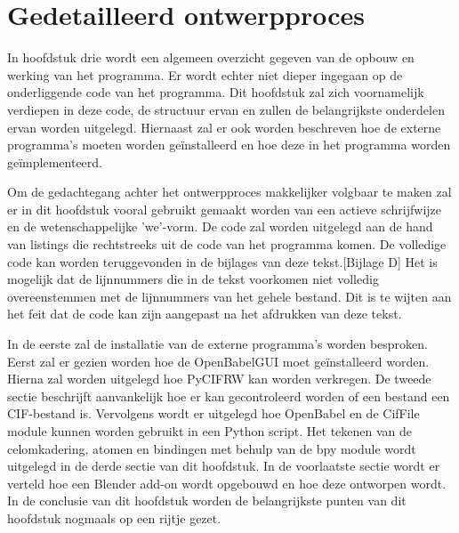 

\chapter{Gedetailleerd ontwerpproces}

In hoofdstuk drie wordt een algemeen overzicht gegeven van de opbouw en werking van het programma. Er wordt echter niet dieper ingegaan op de onderliggende code van het programma. Dit hoofdstuk zal zich voornamelijk verdiepen in deze code, de structuur ervan en zullen de belangrijkste onderdelen ervan worden uitgelegd. Hiernaast zal er ook worden beschreven hoe de externe programma's moeten worden geïnstalleerd en hoe deze in het programma worden geïmplementeerd. 
\par
Om de gedachtegang achter het ontwerpproces makkelijker volgbaar te maken zal er in dit hoofdstuk vooral gebruikt gemaakt worden van een actieve schrijfwijze en de wetenschappelijke 'we'-vorm. De code zal worden uitgelegd aan de hand van listings die rechtstreeks uit de code van het programma komen. De volledige code kan worden teruggevonden in de bijlages van deze tekst.[Bijlage D] Het is mogelijk dat de lijnnummers die in de tekst voorkomen niet volledig overeenstemmen met de lijnnummers van het gehele bestand. Dit is te wijten aan het feit dat de code kan zijn aangepast na het afdrukken van deze tekst.
\par
In de eerste zal de installatie van de externe programma's worden besproken. Eerst zal er gezien worden hoe de OpenBabelGUI moet geïnstalleerd worden. Hierna zal worden uitgelegd hoe PyCIFRW kan worden verkregen. De tweede sectie beschrijft aanvankelijk hoe er kan gecontroleerd worden of een bestand een CIF-bestand is. Vervolgens wordt er uitgelegd hoe OpenBabel en de CifFile module kunnen worden gebruikt in een Python script. Het tekenen van de celomkadering, atomen en bindingen met behulp van de bpy module wordt uitgelegd in de derde sectie van dit hoofdstuk. In de voorlaatste sectie wordt er verteld hoe een Blender add-on wordt opgebouwd en hoe deze ontworpen wordt. In de conclusie van dit hoofdstuk worden de belangrijkste punten van dit hoofdstuk nogmaals op een rijtje gezet.   

